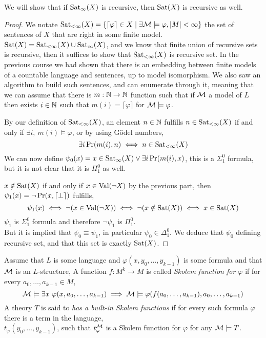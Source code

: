\subquestion{}
We will show that if $\operatorname{Sat}_{\infty}(X)$ is recursive, then $\operatorname{Sat}(X)$ is recursive as well.
\begin{proof}
	We notate $\operatorname{Sat}_{< \infty}(X) = \{ \lceil \varphi \rceil \in X \mid \exists \mathcal{M} \models \varphi, |M| < \infty \}$ the set of sentences of $X$ that are right in some finite model.
	$\operatorname{Sat}(X) = \operatorname{Sat}_{< \infty}(X) \cup \operatorname{Sat}_{\infty}(X)$, and we know that finite union of recursive sets is recursive, then it suffices to show that $\operatorname{Sat}_{< \infty}(X)$ is recursive set.
	In the previous course we had shown that there is an embedding between finite models of a countable language and sentences, up to model isomorphism.
	We also saw an algorithm to build such sentences, and can enumerate through it,
	meaning that we can assume that there is $m : \mathbb{N} \to \mathbb{N}$ function such that if $\mathcal{M}$ a model of $L$ then exists $i \in \mathbb{N}$ such that $m(i) = \lceil \varphi \rceil$ for $\mathcal{M} \models \varphi$.

	By our definition of $\operatorname{Sat}_{< \infty}(X)$, an element $n \in \mathbb{N}$ fulfills $n \in \operatorname{Sat}_{< \infty}(X)$ if and only if $\exists i,\ m(i) \models \varphi$, or by using Gödel numbers,
	\[
		\exists i \operatorname{Pr}(m(i), n)
		\iff n \in \operatorname{Sat}_{< \infty}(X)
	\]
	We can now define $\psi_0(x) = x \in \operatorname{Sat}_{\infty}(X) \lor \exists i \operatorname{Pr}(m(i), x)$, this is a $\Sigma_1^0$ formula, but it is not clear that it is $\Pi_1^0$ as well.

	$x \notin \operatorname{Sat}(X)$ if and only if $x \in \operatorname{Val}(\lnot X)$ by the previous part, then $\psi_1(x) = \lnot \operatorname{Pr}(x, \lceil \perp \rceil)$ fulfills,
	\[
		\psi_1(x)
		\iff \lnot (x \in \operatorname{Val}(\lnot X))
		\iff \lnot (x \notin \operatorname{Sat}(X))
		\iff x \in \operatorname{Sat}(X)
	\]
	$\psi_1$ is $\Sigma_1^0$ formula and therefore $\lnot \psi_1$ is $\Pi_1^0$. \\
	But it is implied that $\psi_0 \equiv \psi_1$, in particular $\psi_0 \in \Delta_1^0$.
	We deduce that $\psi_0$ defining recursive set, and that this set is exactly $\operatorname{Sat}(X)$.
\end{proof}

\question{}
Assume that $L$ is some language and $\varphi(x, y_0, \ldots, y_{k - 1})$ is some formula and that $\mathcal{M}$ is an $L$-structure,
A function $f : M^k \to M$ is called \textit{Skolem function for $\varphi$} if for every $a_0, \ldots, a_{k - 1} \in M$,
\[
	\mathcal{M} \models \exists x\ \varphi(x, a_0, \ldots, a_{k - 1})
	\implies \mathcal{M} \models \varphi(f(a_0, \ldots, a_{k - 1}), a_0, \ldots, a_{k - 1})
\]
A theory $T$ is said to \textit{has a built-in Skolem functions} if for every such formula $\varphi$ there is a term in the language, \\
$t_{\varphi}(y_0, \ldots, y_{k - 1})$, such that $t_\varphi^{\mathcal{M}}$ is a Skolem function for $\varphi$ for any $\mathcal{M} \models T$.

